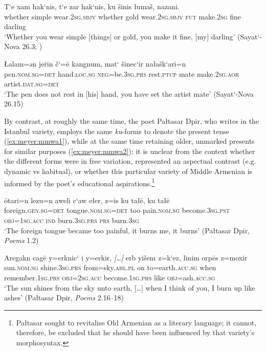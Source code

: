 \documentclass[output=paper,colorlinks,citecolor=brown]{langscibook}
\begin{document}
	\ea \label{ex:meyer:mmea1}
	\gll T‘e xam hak‘nis, t‘e zar hak‘nis, ku šinis łumaš, nazani.\\
	whether simple wear.\textsc{2sg.sbjv} whether gold wear.\textsc{2sg.sbjv} \textsc{fut} make.\textsc{2sg} fine darling\\
	\glt ‘Whether you wear simple [things] or gold, you make it fine, [my] darling’ (Sayat‘-Nova 26.3; \citealt{Meyer2023d})
	\z {}
	
	\ea \label{ex:meyer:mmea2}
	\gll Łalam=ən jeṙin č‘=ē kangnum, mat‘ šinec‘ir nałašk‘ari=n\\
	pen.\textsc{nom.sg=det} hand.\textsc{loc.sg} \textsc{neg=}be.\textsc{3sg.prs} rest.\textsc{ptcp} mate make.\textsc{2sg.aor} artist.\textsc{dat.sg=det}\\	
	\glt ‘The pen does not rest in [his] hand, you have set the artist mate’ (Sayat‘-Nova 26.15)
	\z {}
	
	By contrast, at roughly the same time, the poet Pałtasar Dpir, who writes in the Istanbul variety, employs the same \textit{ku}-forms to denote the present tense (\ref{ex:meyer:mmwa1}), while at the same time retaining older, unmarked presents for similar purposes (\ref{ex:meyer:mmwa2}); it is unclear from the context whether the different forms were in free variation, represented an aspectual contrast (e.g. dynamic vs habitual), or whether this particular variety of Middle Armenian is informed by the poet's educational aspirations.\footnote{Pałtasar sought to revitalise Old Armenian as a literary language; it cannot, therefore, be excluded that he should have been influenced by that variety's morphosyntax.}
	
	\ea \label{ex:meyer:mmwa1}
	\gll ōtari=n lezu=n aweli c‘aw ełer, z=is ku tałē, ku tałē\\
	foreign.\textsc{gen.sg=det} tongue.\textsc{nom.sg=det} too pain.\textsc{nom.sg} become.\textsc{3sg.pst} \textsc{obj=1sg.acc} \textsc{ind} burn.\textsc{3sg.prs} \textsc{prs} burn.\textsc{3sg}\\
	
	\glt ‘The foreign tongue became too painful, it burns me, it burns’ (Pałtasar Dpir, \textit{Poems} 1.2)
	\z {}
	
	\ea \label{ex:meyer:mmwa2}
	\gll Aregakn cagē y=erknic‘ i y=erkir, \emph{[…]} erb yišem z=k‘ez, linim orpēs z=moxir\\
	sun.\textsc{nom.sg} shine.\textsc{3sg.prs} from=sky.\textsc{abl.pl} on to=earth.\textsc{acc.sg} {} when remember.\textsc{1sg.prs} \textsc{obj=2sg.acc} become.\textsc{1sg.prs} like \textsc{obj=}ash.\textsc{acc.sg}\\
	\glt ‘The sun shines from the sky unto earth, […] when I think of you, I burn up like ashes’ (Pałtasar Dpir, \textit{Poems} 2.16–18)
	\z {}
	
\end{document}
